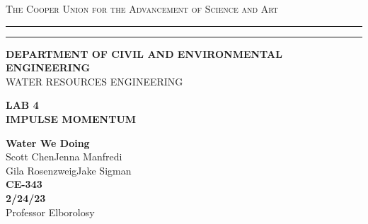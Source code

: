 \begin{titlepage}
    \begin{center}
    {{\Large{\textsc{The Cooper Union for the Advancement of Science and Art}}}} \rule[0.1cm]{15.8cm}{0.1mm}
    \rule[0.5cm]{15.8cm}{0.6mm}
    {\small{\bf DEPARTMENT OF CIVIL AND ENVIRONMENTAL ENGINEERING}}\\
    {\footnotesize{WATER RESOURCES ENGINEERING}}
    \end{center}
    \vspace{15mm}
    \begin{center}
    {\large{\bf LAB 4\\}}
    \vspace{5mm}
    {\Large{\bf IMPULSE MOMENTUM}}
    \end{center}
    \vspace{35mm}
    \par
    \noindent
    \hfill
    \vspace{20mm}
    \begin{center}
    {\large{ {\bf Water We Doing} \\ { Scott Chen\hspace{5mm}Jenna Manfredi\\Gila Rosenzweig\hspace{5mm}Jake Sigman}}}
    \vspace{40mm}
    {\large {\bf \\CE-343 \\ 2/24/23 \\}}
    \vspace{15mm}
    {\normalsize{Professor Elborolosy}}
    \end{center}
\end{titlepage}